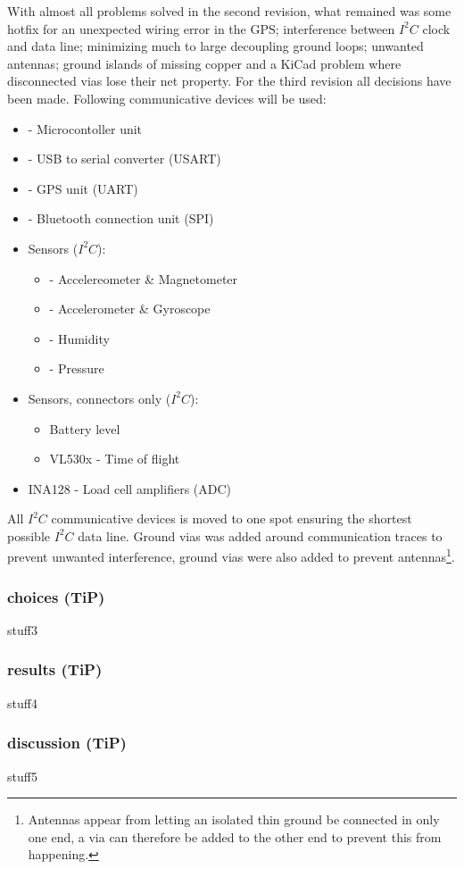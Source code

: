 With almost all problems solved in the second revision, what remained was some hotfix for an unexpected wiring error in the GPS; interference between $I^2C$ clock and data line; minimizing much to large decoupling ground loops; unwanted antennas; ground islands of missing copper and  a KiCad problem where disconnected vias lose their net property.
For the third revision all decisions have been made. Following communicative devices will be used:
\begin{itemize}
\item{ - Microcontoller unit}
\item{ - USB to serial converter (USART)}
\item{ - GPS unit (UART)}
\item{ - Bluetooth connection unit (SPI)}
\item Sensors ($I^2C$):
	\begin{itemize}
	\item{ - Accelereometer \& Magnetometer}
	\item{ - Accelerometer \& Gyroscope}
	\item{ - Humidity}
	\item{ - Pressure}
	\end{itemize}
\item Sensors, connectors only ($I^2C$):
	\begin{itemize}
	\item Battery level
	\item VL530x \qquad- Time of flight
	\end{itemize}
\item INA128 \qquad- Load cell amplifiers (ADC)
\end{itemize}
All $I^2C$ communicative devices is moved to one spot ensuring the shortest possible $I^2C$ data line. Ground vias was added around communication traces to prevent unwanted interference, ground vias were also added to prevent antennas\footnote{Antennas appear from letting an isolated thin ground be connected in only one end, a via can therefore be added to the other end to prevent this from happening.}.

\subsubsection{choices (TiP)}
stuff3

\subsubsection{results (TiP)}
stuff4

\subsubsection{discussion (TiP)}
stuff5